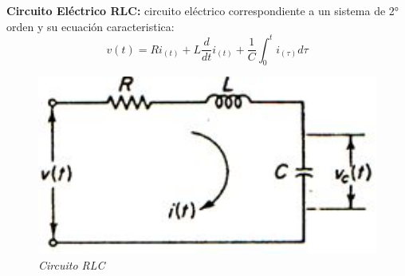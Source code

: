 \documentclass[12pt,a4paper]{report}
\begin{document}
  \newpage
  \textbf{Circuito Eléctrico RLC:} circuito eléctrico correspondiente a un sistema de 2° orden y su ecuación
  caracteristica:
  \begin{equation*}
    v(t) = Ri_{(t)} + L \frac{d}{dt} i_{(t)} + \frac{1}{C} \int_{0}^{t} i_{(\tau)} d\tau
  \end{equation*}

  \vspace{-1cm}
  \noindent
  \begin{figure}[h]
    \centering
    \begin{minipage}[h]{0.5\textwidth}
      \centering
      \includegraphics[width=1\textwidth]{./images/ej4.5.jpg}
      \textit{Circuito RLC}
    \end{minipage}
  \end{figure}
\end{document}
